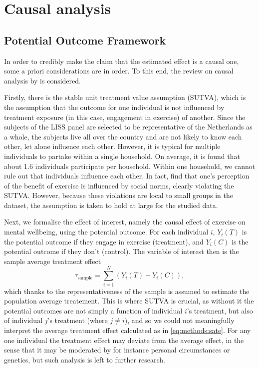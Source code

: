 \section{Causal analysis}
\label{sec:methods:causal}

\subsection{Potential Outcome Framework}
In order to credibly make the claim that the estimated effect is a causal one, some a priori considerations are in order.
To this end, the review on causal analysis by  is considered.

Firstly, there is the stable unit treatment value assumption (SUTVA), which is the assumption that the outcome for one
individual is not influenced by treatment exposure (in this case, engagement in exercise) of another.
Since the subjects of the LISS panel are selected to be representative of the Netherlands as a whole, the subjects
live all over the country and are not likely to know each other, let alone influence each other. However, it is typical
for multiple individuals to partake within a single household. On average, it is found that about 1.6 individuals participate
per household. Within one household, we cannot rule out that individuals influence each other. In fact, 
find that one's perception of the benefit of exercise is influenced by social norms, clearly violating the SUTVA.
However, because these violations are local to small groups in the dataset, the assumption is taken to hold at large for
the studied data.

Next, we formalise the effect of interest, namely the causal effect of exercise on mental wellbeing, using the
potential outcome.
For each individual $i$, $Y_i(T)$ is the potential outcome if they engage in exercise (treatment),
and $Y_i(C)$ is the potential outcome if they don't (control). The variable of interest then is the sample average
treatment effect
\begin{equation}
\label{eq:methods:sate}
    \tau_{\text{sample}} = \sum_{i=1}^N (Y_i(T) - Y_i(C)),
\end{equation}
which thanks to the representativeness of the sample is assumed to estimate the population average treatement.
This is where SUTVA is crucial, as without it the potential outcomes are not simply a function of individual $i$'s treatment,
but also of individual $j$'s treatment (where $j \neq i$), and so we could not meaningfully interpret the average
treatment effect calculated as in \cref{eq:methods:sate}.
For any one individual the treatment effect may deviate from the average effect, in the sense that it may be moderated by
for instance personal circumstances or genetics, but such analysis is left to further research.

